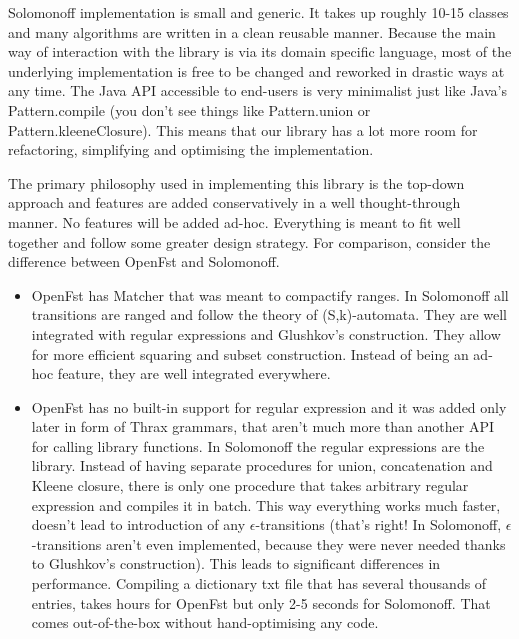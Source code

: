 Solomonoff implementation is small and generic. It takes up roughly 10-15 classes and many algorithms are written in a clean reusable manner. Because the main way of interaction with the library is via its domain specific language, most of the underlying implementation is free to be changed and reworked in drastic ways at any time. The Java API accessible to end-users is very minimalist just like Java's Pattern.compile (you don't see things like Pattern.union or Pattern.kleeneClosure). This means that our library has a lot more room for refactoring, simplifying and optimising the implementation.

The primary philosophy used in implementing this library is the top-down approach and features are added conservatively in a well thought-through manner. No features will be added ad-hoc. Everything is meant to fit well together and follow some greater design strategy. For comparison, consider the difference between OpenFst and Solomonoff.

\begin{itemize}
	\item OpenFst has Matcher that was meant to compactify ranges. In Solomonoff all transitions are ranged and follow the theory of (S,k)-automata. They are well integrated with regular expressions and Glushkov's construction. They allow for more efficient squaring and subset construction. Instead of being an ad-hoc feature, they are well integrated everywhere.
	
	\item OpenFst has no built-in support for regular expression and it was added only later in form of Thrax grammars, that aren't much more than another API for calling library functions. In Solomonoff the regular expressions are the library. Instead of having separate procedures for union, concatenation and Kleene closure, there is only one procedure that takes arbitrary regular expression and compiles it in batch. This way everything works much faster, doesn't lead to introduction of any $\epsilon$-transitions (that's right! In Solomonoff, $\epsilon$-transitions aren't even implemented, because they were never needed thanks to Glushkov's construction). This leads to significant differences in performance. Compiling a dictionary txt file that has several thousands of entries, takes hours for OpenFst but only 2-5 seconds for Solomonoff. That comes out-of-the-box without hand-optimising any code.
	
\end{itemize}


